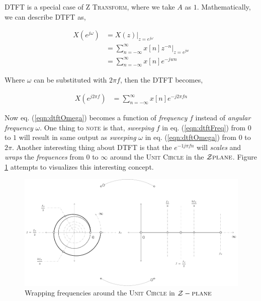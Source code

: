 \documentclass[../../course]{subfiles}
\begin{document}
\textsc{DTFT} is a special case of \textsc{Z Transform}, where we take $A$
as $1$. Mathematically, we can describe \textsc{DTFT} as,

\begin{align}
    X(e^{j \omega}) &= X(z) |_{z = e^{j \omega}} \\
    &= \sum_{n = - \infty}^{\infty} x[n] z^{-n} \Big|_{z = e^{jw}} \\
    &= \sum_{n = - \infty}^{\infty} x[n] e^{-j w n} \label{eqn:dtftOmega}
\end{align}

Where $\omega$ can be substituted with $2 \pi f$, then the \textsc{DTFT} becomes,

\begin{align}
    X(e^{j 2 \pi f}) &= \sum_{n = - \infty}^{\infty} x[n] e^{-j 2 \pi f n}
    \label{eqn:dtftFreq}
\end{align}

Now eq. (\ref{eqn:dtftOmega}) becomes a function of \emph{frequency} $f$
instead of \emph{angular frequency} $\omega$. One thing to \textsc{note} is that,
\emph{sweeping} $f$ in eq. (\ref{eqn:dtftFreq}) from $0$ to $1$ will result in same
output as \emph{sweeping} $\omega$ in eq. (\ref{eqn:dtftOmega}) from $0$ to $2 \pi$.
Another interesting thing about \textsc{DTFT} is that the $e^{-1j \pi f n}$ will
\emph{scales} and \emph{wraps} the \emph{frequences} from $0$ to $\infty$ around
the \textsc{Unit Circle} in the $\mathcal{Z} \textsc{plane}$. Figure \ref{fig:wrapFreqUnitCircle}
attempts to visualizes this interesting concept.

\begin{figure}
    \centering
     {
        \includegraphics[height = 1\textheight] {tikzpics/epicWrapFreqUnitCircle.pdf}
    }
     {
        Wrapping frequencies around the \textsc{Unit Circle} in $\mathcal{Z}-\textsc{plane}$
    }
    \label{fig:wrapFreqUnitCircle}
\end{figure}
\end{document}
